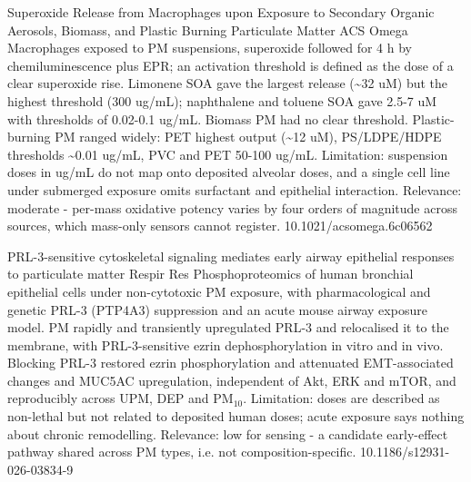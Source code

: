 \documentclass[10pt]{article}
\begin{document}
\par{}\baselineskip{}\baselineskip
{}

{Superoxide Release from Macrophages upon Exposure to Secondary Organic Aerosols, Biomass, and Plastic Burning Particulate Matter}
{ACS Omega}
{Macrophages exposed to PM suspensions, superoxide followed for 4 h by chemiluminescence plus EPR; an activation threshold is defined as the dose of a clear superoxide rise. Limonene SOA gave the largest release (\textasciitilde{}32 uM) but the highest threshold (300 ug/mL); naphthalene and toluene SOA gave 2.5-7 uM with thresholds of 0.02-0.1 ug/mL. Biomass PM had no clear threshold. Plastic-burning PM ranged widely: PET highest output (\textasciitilde{}12 uM), PS/LDPE/HDPE thresholds \textasciitilde{}0.01 ug/mL, PVC and PET 50-100 ug/mL. Limitation: suspension doses in ug/mL do not map onto deposited alveolar doses, and a single cell line under submerged exposure omits surfactant and epithelial interaction. Relevance: moderate - per-mass oxidative potency varies by four orders of magnitude across sources, which mass-only sensors cannot register.}
{10.1021/acsomega.6c06562}

{PRL-3-sensitive cytoskeletal signaling mediates early airway epithelial responses to particulate matter}
{Respir Res}
{Phosphoproteomics of human bronchial epithelial cells under non-cytotoxic PM exposure, with pharmacological and genetic PRL-3 (PTP4A3) suppression and an acute mouse airway exposure model. PM rapidly and transiently upregulated PRL-3 and relocalised it to the membrane, with PRL-3-sensitive ezrin dephosphorylation in vitro and in vivo. Blocking PRL-3 restored ezrin phosphorylation and attenuated EMT-associated changes and MUC5AC upregulation, independent of Akt, ERK and mTOR, and reproducibly across UPM, DEP and PM$_{10}$. Limitation: doses are described as non-lethal but not related to deposited human doses; acute exposure says nothing about chronic remodelling. Relevance: low for sensing - a candidate early-effect pathway shared across PM types, i.e. not composition-specific.}
{10.1186/s12931-026-03834-9}

\par{}\baselineskip{}\baselineskip
{}
\end{document}
